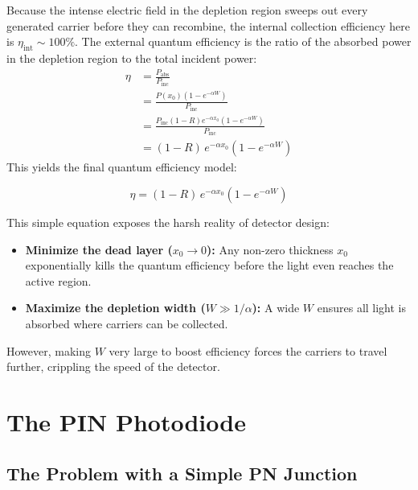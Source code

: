 Because the intense electric field in the depletion region sweeps out every generated carrier before they can recombine, the internal collection efficiency here is $\eta_\text{int} \sim 100\%$. The external quantum efficiency is the ratio of the absorbed power in the depletion region to the total incident power:
\begin{align*}
    \eta &= \frac{P_{\text{abs}}}{P_{\text{inc}}} \\[6pt]
    &= \frac{P(x_0)\left(1 - e^{-\alpha W}\right)}{P_{\text{inc}}} \\[6pt]
    &= \frac{P_{\text{inc}}(1 - R)e^{-\alpha x_0}\left(1 - e^{-\alpha W}\right)}{P_{\text{inc}}} \\[6pt]
    &= (1 - R)\,e^{-\alpha x_0}\!\left(1 - e^{-\alpha W}\right)
\end{align*}
This yields the final quantum efficiency model:
\begin{keyresult}
    \begin{equation}
        \eta = (1 - R)\,e^{-\alpha x_0}\!\left(1 - e^{-\alpha W}\right)
    \end{equation}
\end{keyresult}

This simple equation exposes the harsh reality of detector design:
\begin{itemize}
    \item \textbf{Minimize the dead layer ($x_0 \to 0$):} Any non-zero thickness $x_0$ exponentially kills the quantum efficiency before the light even reaches the active region.
    \item \textbf{Maximize the depletion width ($W \gg 1/\alpha$):} A wide $W$ ensures all light is absorbed where carriers can be collected.
\end{itemize}
However, making $W$ very large to boost efficiency forces the carriers to travel further, crippling the speed of the detector.



\section{The PIN Photodiode}

\subsection{The Problem with a Simple PN Junction}

